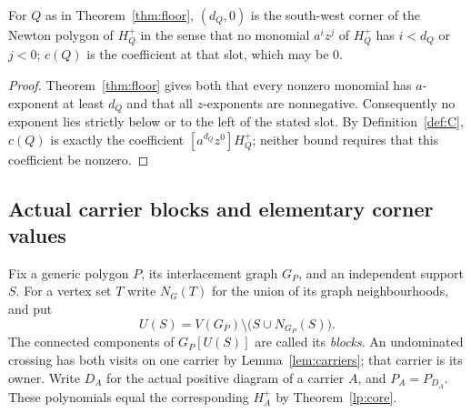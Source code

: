 \begin{corollary}\label{cor:corner}
For $Q$ as in Theorem~\ref{thm:floor}, $(d_Q,0)$ is the south-west corner of
the Newton polygon of $H^+_Q$ in the sense that no monomial $a^iz^j$ of
$H^+_Q$ has $i<d_Q$ or $j<0$; $c(Q)$ is the coefficient at that slot, which
may be $0$. 
\end{corollary}
\begin{proof}
Theorem~\ref{thm:floor} gives both that every nonzero monomial has
$a$-exponent at least $d_Q$ and that all $z$-exponents are nonnegative.
Consequently no exponent lies strictly below or to the left of the stated
slot. By Definition~\ref{def:C}, $c(Q)$ is exactly the coefficient
$[a^{d_Q}z^0]H^+_Q$; neither bound requires that this coefficient be nonzero.
\end{proof}


\subsection{Actual carrier blocks and elementary corner values}

\begin{definition}\label{cb:blocks}
Fix a generic polygon $P$, its interlacement graph $G_P$, and an
independent support $S$. For a vertex set $T$ write $N_G(T)$ for the
union of its graph neighbourhoods, and put
\begin{equation}\label{cb:undominated}
 U(S)=V(G_P)\setminus\bigl(S\cup N_{G_P}(S)\bigr).
\end{equation}
The connected components of $G_P[U(S)]$ are called its \emph{blocks}.
An undominated crossing has both visits on one carrier by
Lemma~\ref{lem:carriers}; that carrier is its owner. Write $D_A$ for
the actual positive diagram of a carrier $A$, and $P_A=P_{D_A}$.
These polynomials equal the corresponding $H_A^+$ by
Theorem~\ref{lp:core}.
\end{definition}


